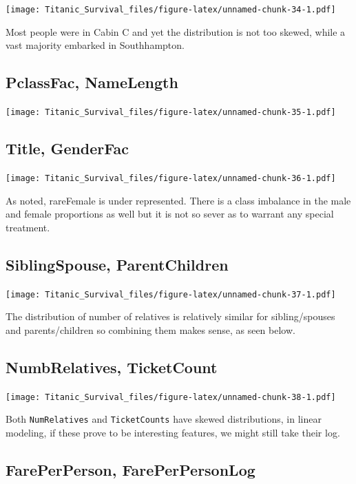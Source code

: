 \documentclass[]{article}
\begin{document}
\texttt{[image: Titanic\_Survival\_files/figure-latex/unnamed-chunk-34-1.pdf]}

Most people were in Cabin C and yet the distribution is not too skewed,
while a vast majority embarked in Southhampton.

\subsection{PclassFac, NameLength}\label{pclassfac-namelength}

\texttt{[image: Titanic\_Survival\_files/figure-latex/unnamed-chunk-35-1.pdf]}

\subsection{Title, GenderFac}\label{title-genderfac}

\texttt{[image: Titanic\_Survival\_files/figure-latex/unnamed-chunk-36-1.pdf]}

As noted, rareFemale is under represented. There is a class imbalance in
the male and female proportions as well but it is not so sever as to
warrant any special treatment.

\subsection{SiblingSpouse,
ParentChildren}\label{siblingspouse-parentchildren}

\texttt{[image: Titanic\_Survival\_files/figure-latex/unnamed-chunk-37-1.pdf]}

The distribution of number of relatives is relatively similar for
sibling/spouses and parents/children so combining them makes sense, as
seen below.

\subsection{NumbRelatives, TicketCount}\label{numbrelatives-ticketcount}

\texttt{[image: Titanic\_Survival\_files/figure-latex/unnamed-chunk-38-1.pdf]}

Both \texttt{NumRelatives} and \texttt{TicketCounts} have skewed
distributions, in linear modeling, if these prove to be interesting
features, we might still take their log.

\subsection{FarePerPerson,
FarePerPersonLog}\label{fareperperson-fareperpersonlog}
\end{document}
